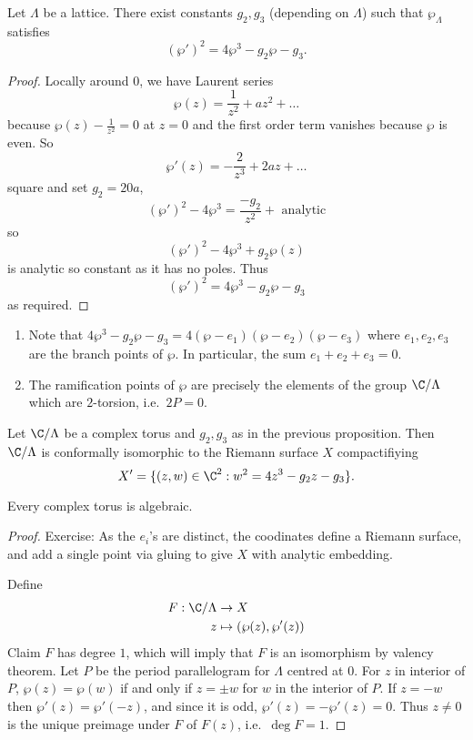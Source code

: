 \documentclass[a4paper]{article}
\begin{document}
\begin{proposition}
  Let \(\Lambda\) be a lattice. There exist constants \(g_2, g_3\) (depending on \(\Lambda\)) such that \(\wp_\Lambda\) satisfies
  \[
    (\wp')^2 = 4 \wp^3 - g_2 \wp - g_3.
  \]
\end{proposition}

\begin{proof}
  Locally around \(0\), we have Laurent series
  \[
    \wp(z) = \frac{1}{z^2} + az^2 + \dots
  \]
  because \(\wp(z) - \frac{1}{z^2} = 0\) at \(z = 0\) and the first order term vanishes because \(\wp\) is even. So
  \[
    \wp'(z) = - \frac{2}{z^3} + 2az + \dots
  \]
  square and set \(g_2 = 20a\),
  \[
    (\wp')^2 - 4\wp^3 = \frac{-g_2}{z^2} + \text{ analytic}
  \]
  so
  \[
    (\wp')^2 - 4\wp^3 + g_2 \wp(z)
  \]
  is analytic so constant as it has no poles. Thus
  \[
    (\wp')^2 = 4\wp^3 - g_2 \wp - g_3
  \]
  as required.
\end{proof}

\begin{note}\leavevmode
  \begin{enumerate}
  \item Note that \(4\wp^3 - g_2 \wp - g_3 = 4 (\wp - e_1) (\wp - e_2) (\wp - e_3)\) where \(e_1, e_2, e_3\) are the branch points of \(\wp\). In particular, the sum \(e_1 + e_2 + e_3 = 0\).
  \item The ramification points of \(\wp\) are precisely the elements of the group \(\C/\Lambda\) which are \(2\)-torsion, i.e.\ \(2P = 0\).
  \end{enumerate}
\end{note}

\begin{corollary}
  Let \(\C / \Lambda\) be a complex torus and \(g_2, g_3\) as in the previous proposition. Then \(\C / \Lambda\) is conformally isomorphic to the Riemann surface \(X\) compactifiying
  \[
    X' = \{(z, w) \in \C^2: w^2 = 4z^3 - g_2z - g_3\}.
  \]
\end{corollary}

Every complex torus is algebraic.

\begin{proof}
  Exercise: As the \(e_i\)'s are distinct, the coodinates define a Riemann surface, and add a single point via gluing to give \(X\) with analytic embedding.

  Define
  \begin{align*}
    F: \C / \Lambda &\to X \\
    z &\mapsto (\wp(z), \wp'(z))
  \end{align*}
  Claim \(F\) has degree \(1\), which will imply that \(F\) is an isomorphism by valency theorem. Let \(P\) be the period parallelogram for \(\Lambda\) centred at \(0\). For \(z\) in interior of \(P\), \(\wp(z) = \wp(w)\) if and only if \(z = \pm w\) for \(w\) in the interior of \(P\). If \(z = -w\) then \(\wp'(z) = \wp'(-z)\), and since it is odd, \(\wp'(z) = -\wp'(z) = 0\). Thus \(z \neq 0\) is the unique preimage under \(F\) of \(F(z)\), i.e.\ \(\deg F = 1\). %
\end{proof}
\end{document}
